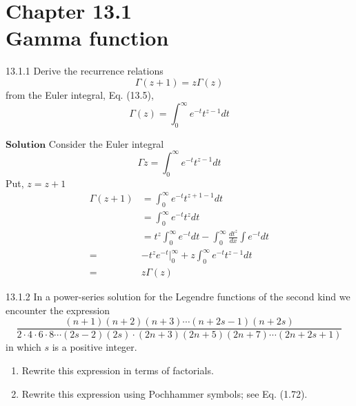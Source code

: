 \documentclass{styles/kaobook}
\begin{document}
\chapter*{Chapter 13.1 \\ Gamma function}

\begin{greenbox}{13.1.1}
Derive the recurrence relations
$$
\Gamma(z+1)=z \Gamma(z)
$$
from the Euler integral, Eq. (13.5),
$$
\Gamma(z)=\int_{0}^{\infty} e^{-t} t^{z-1} d t
$$
\end{greenbox}

$\boxed{\textbf{Solution}}$ Consider the Euler integral 
$$\Gamma z=\int_{0}^{\infty} e^{-t} t^{z-1} d t$$
Put, $z=z+1$
$$
\begin{aligned}
\Gamma(z+1) &=\int_{0}^{\infty} e^{-t} t^{z+1-1} d t \\
&=\int_{0}^{\infty} e^{-t} t^{z} d t \\
&=t^{z} \int_{0}^{\infty} e^{-t} d t-\int_{0}^{\infty} \frac{d t^{z}}{d x} \int e^{-t} d t \\
=&-t^{z} e^{-t}\Big|_{0} ^{\infty}+z \int_{0}^{\infty} e^{-t} t^{z-1} d t \\
=& z \Gamma(z)
\end{aligned}
$$

\begin{greenbox}{13.1.2}
In a power-series solution for the Legendre functions of the second kind we encounter the expression
$$
\frac{(n+1)(n+2)(n+3) \cdots(n+2 s-1)(n+2 s)}{2 \cdot 4 \cdot 6 \cdot 8 \cdots(2 s-2)(2 s) \cdot(2 n+3)(2 n+5)(2 n+7) \cdots(2 n+2 s+1)}
$$
in which $s$ is a positive integer.
\begin{enumerate}[$(a)$]
\item Rewrite this expression in terms of factorials.
\item Rewrite this expression using Pochhammer symbols; see Eq. (1.72).
\end{enumerate}
\end{greenbox}
\end{document}
